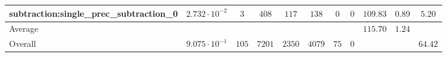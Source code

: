 \begin{tabular}{|l|c|c|c|c|c|c|c|c|c|c|}
subtraction:single\_prec\_subtraction\_0         & $ 2.732 \cdot 10^{-2} $ & $ 3      $ & $ 408  $ & $ 117  $ & $ 138   $ & $ 0  $ & $ 0 $ & $ 109.83      $ & $ 0.89    $ & $ 5.20    $ \\
\hline
Average                                          & $                     $ & $        $ & $      $ & $      $ & $       $ & $    $ & $   $ & $ 115.70      $ & $ 1.24    $ & $         $ \\
\hline
Overall                                          & $ 9.075 \cdot 10^{-1} $ & $ 105    $ & $ 7201 $ & $ 2350 $ & $ 4079  $ & $ 75 $ & $ 0 $ & $             $ & $         $ & $ 64.42   $ \\
\hline
\end{tabular}
